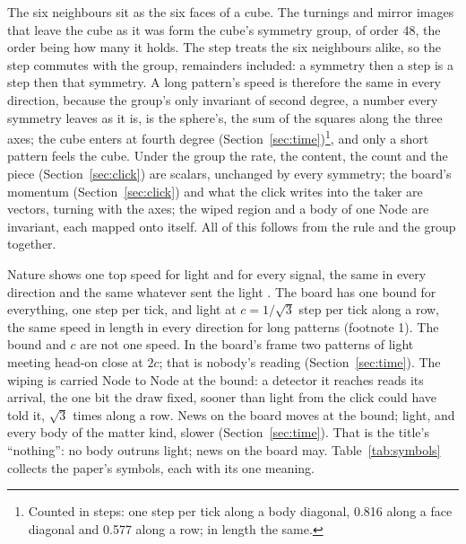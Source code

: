 \documentclass[pdflatex,sn-mathphys-num]{sn-jnl}
\begin{document}
The six neighbours sit as the six faces of a cube. The turnings and mirror images that leave the cube as it was form the cube's symmetry group, of order 48, the order being how many it holds. The step treats the six neighbours alike, so the step commutes with the group, remainders included: a symmetry then a step is a step then that symmetry. A long pattern's speed is therefore the same in every direction, because the group's only invariant of second degree, a number every symmetry leaves as it is, is the sphere's, the sum of the squares along the three axes; the cube enters at fourth degree (Section~\ref{sec:time})\footnote{Counted in steps: one step per tick along a body diagonal, 0.816 along a face diagonal and 0.577 along a row; in length the same.}, and only a short pattern feels the cube. Under the group the rate, the content, the count and the piece (Section~\ref{sec:click}) are scalars, unchanged by every symmetry; the board's momentum (Section~\ref{sec:click}) and what the click writes into the taker are vectors, turning with the axes; the wiped region and a body of one Node are invariant, each mapped onto itself. All of this follows from the rule and the group together.

Nature shows one top speed for light and for every signal, the same in every direction and the same whatever sent the light \cite{brecher1977,michelson1887}. The board has one bound for everything, one step per tick, and light at $c = 1/\sqrt3$ step per tick along a row, the same speed in length in every direction for long patterns (footnote 1). The bound and $c$ are not one speed. In the board's frame two patterns of light meeting head-on close at $2c$; that is nobody's reading (Section~\ref{sec:time}). The wiping is carried Node to Node at the bound: a detector it reaches reads its arrival, the one bit the draw fixed, sooner than light from the click could have told it, $\sqrt3$ times along a row. News on the board moves at the bound; light, and every body of the matter kind, slower (Section~\ref{sec:time}). That is the title's ``nothing'': no body outruns light; news on the board may. Table~\ref{tab:symbols} collects the paper's symbols, each with its one meaning.
\end{document}
